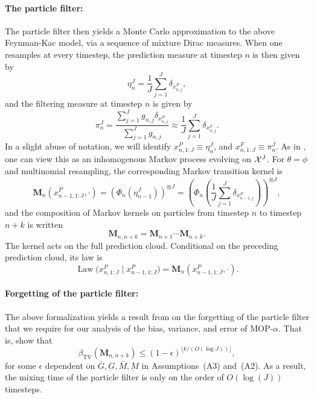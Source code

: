 \documentclass[11pt]{article}
\newcommand\refAssumpBoundedProcess{(A2)} %
\newcommand\refAssumpBoundedMeasurement{(A3)} %
\theoremstyle{thmstylethree}%
\begin{document}
\paragraph{\bf The particle filter:} The particle filter then yields a Monte Carlo approximation to the above Feynman-Kac model, via a sequence of mixture Dirac measures. When one resamples at every timestep, the prediction measure at timestep $n$ is then given by 
\begin{equation}
\eta_n^J = \frac{1}{J}\sum_{j=1}^J \delta_{x_{n,j}^P},
\end{equation}
and the filtering measure at timestep $n$ is given by
\begin{equation}
\pi_n^J = \frac{\sum_{j=1}^J g_{n,j} \delta_{x_{n,j}^P}}{\sum_{j=1}^J g_{n,j}} \approx \frac{1}{J} \sum_{j=1}^J \delta_{x_{n,j}^F}.
\end{equation}
In a slight abuse of notation, we will identify $x_{n, 1:J}^P \equiv \eta_n^J$, and $x_{n, 1:J}^F \equiv \pi_n^J$. 
As in \cite{karjalainen23}, one can view this as an inhomogenous Markov process evolving on ${\mathcal{X}}^{J}$. For $\theta=\phi$ and multinomial resampling, the corresponding
Markov transition kernel is
\begin{equation}
\textbf{M}_n(x_{n-1, 1:J}^P, \cdot) = \left(\Phi_{n}\left(\eta_{n-1}^J\right)\right)^{\otimes J} = \left(\Phi_{n}\left(\frac{1}{J}\sum_{j=1}^J \delta_{x_{n-1,j}^P}\right)\right)^{\otimes J},
\end{equation}
and the composition of Markov kernels on particles from timestep $n$ to timestep $n+k$ is written 
\begin{equation}
\textbf{M}_{n, n+k} = \textbf{M}_{n+1}\cdots \textbf{M}_{n+k}.
\end{equation}
The kernel acts on the full prediction cloud. Conditional on the preceding
prediction cloud, its law is
\begin{equation}
\operatorname{Law}\big(x_{n,1:J}^P\mid x_{n-1,1:J}^P\big)
=\textbf{M}_n(x_{n-1,1:J}^P,\cdot).
\end{equation}

\paragraph{\bf Forgetting of the particle filter:} 
The above formalization yields a result from \cite{karjalainen23} on the forgetting of the particle filter that we require for our analysis of the bias, variance, and error of MOP-$\alpha$.  
That is, \cite{karjalainen23} show that
\begin{equation}
\beta_{\mathrm{TV}}\left(\mathbf{M}_{n, n+k}\right) \leq(1-\epsilon)^{\lfloor k /(O(\log J))\rfloor},
\end{equation}
for some $\epsilon$ dependent on $\bar{G}, \underbar{G}, \bar{M}, \underbar{M}$ in Assumptions~{\refAssumpBoundedMeasurement} and~{\refAssumpBoundedProcess}. As a result, the mixing time of the particle filter is only on the order of $O(\log(J))$ timesteps. 
\end{document}
